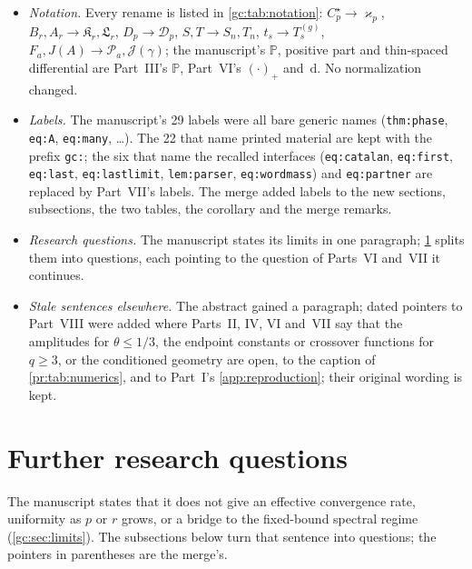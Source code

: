 \documentclass[11pt,a4paper]{article}
\theoremstyle{definition}\newaliascnt{definition}{theorem}
\theoremstyle{remark}\newaliascnt{remark}{theorem}
\newcommand{\dd}{\mathrm d}
\newcommand{\ljP}{\mathbb P}
\newcommand{\prpos}[1]{(#1)_+}
\begin{document}
\begin{itemize}
 the family bounds, after \cref{gc:sec:shrinking,gc:sec:background}, after
 \cref{gc:cor:third}, and in \cref{gc:sec:finite} (the scope of the channel
 check, the convergence evidence); \cref{gc:rem:cases,gc:rem:matching,gc:rem:masses,gc:rem:geometry}.
 No step of the manuscript was changed.
\item \emph{Notation.} Every rename is listed in \cref{gc:tab:notation}:
 $C_p^\star\to\varkappa_p$, $B_r,A_r\to\mathfrak K_r,\mathfrak L_r$,
 $D_p\to\mathcal D_p$, $S,T\to S_n,T_n$, $t_s\to T^{(g)}_s$,
 $F_a,J(A)\to\mathcal P_a,\mathcal J(\gamma)$; the manuscript's $\mathbb P$,
 positive part and thin-spaced differential are Part~III's $\ljP$, Part~VI's
 $\prpos{\cdot}$ and $\,\dd$. No normalization changed.
\item \emph{Labels.} The manuscript's 29 labels were all bare generic names
 (\texttt{thm:phase}, \texttt{eq:A}, \texttt{eq:many}, \ldots). The 22 that
 name printed material are kept with the prefix \texttt{gc:}; the six that
 name the recalled interfaces (\texttt{eq:catalan}, \texttt{eq:first},
 \texttt{eq:last}, \texttt{eq:lastlimit}, \texttt{lem:parser},
 \texttt{eq:wordmass}) and \texttt{eq:partner} are replaced by Part~VII's
 labels. The merge added labels to the new sections, subsections, the two
 tables, the corollary and the merge remarks.
\item \emph{Research questions.} The manuscript states its limits in one
 paragraph; \cref{gc:sec:research} splits them into questions, each pointing
 to the question of Parts~VI and~VII it continues.
\item \emph{Stale sentences elsewhere.} The abstract gained a paragraph; dated
 pointers to Part~VIII were added where Parts~II, IV, VI and~VII say that the
 amplitudes for $\theta\le1/3$, the endpoint constants or crossover functions
 for $q\ge3$, or the conditioned geometry are open, to the caption of
 \cref{pr:tab:numerics}, and to Part~I's \cref{app:reproduction}; their
 original wording is kept.
\end{itemize}

\section{Further research questions}
\label{gc:sec:research}
The manuscript states that it does not give an effective convergence rate,
uniformity as $p$ or $r$ grows, or a bridge to the fixed-bound spectral regime
(\cref{gc:sec:limits}). The subsections below turn that sentence into
questions; the pointers in parentheses are the merge's.
\end{document}
